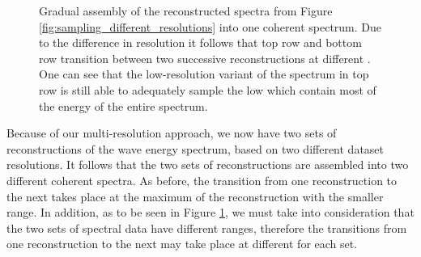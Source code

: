\begin{figure}[p]
\caption{Gradual assembly of the reconstructed spectra from Figure
\ref{fig:sampling_different_resolutions} into one coherent spectrum.
Due to the difference in resolution it follows that top row and bottom row
transition between two successive reconstructions at different \wavenumbers.
One can see that the low-resolution variant of the spectrum in top row is still
able to adequately sample the low \wavenumbers which contain most of the energy
of the entire spectrum.
}
\label{fig:sampling_different_resolutions_pattern_assembly}
\end{figure}
%
%
Because of our multi-resolution approach, we now have two sets of
reconstructions of the wave energy spectrum, based on two different
dataset resolutions.
It follows that the two sets of reconstructions are assembled into two
different coherent spectra.
As before, the transition from one reconstruction to the next takes place at
the maximum \wavenumber of the reconstruction with the smaller \wavenumber
range.
In addition, as to be seen in Figure \ref{fig:sampling_different_resolutions_pattern_assembly},
we must take into consideration that the two sets of
spectral data have different \wavenumber ranges, therefore the transitions from
one reconstruction to the next may take place at different \wavenumbers for
each set.\\

